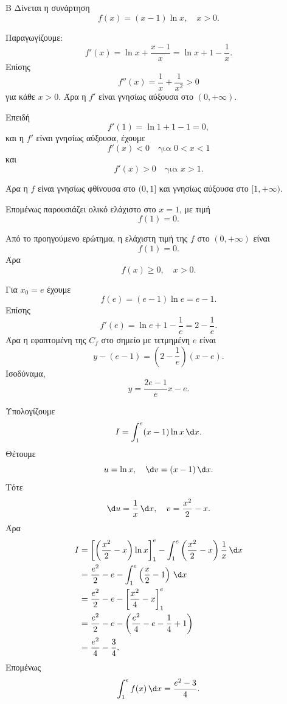 \begin{thema}{Β}
Δίνεται η συνάρτηση
\[
f(x)=(x-1)\ln x,\quad x>0.
\]
\begin{erwthma}
\item Παραγωγίζουμε:
\[
f'(x)=\ln x+\frac{x-1}{x}
=\ln x+1-\frac1x.
\]
Επίσης
\[
f''(x)=\frac1x+\frac{1}{x^2}>0
\]
για κάθε $x>0$. Άρα η $f'$ είναι γνησίως αύξουσα στο $(0,+\infty)$.

Επειδή
\[
f'(1)=\ln1+1-1=0,
\]
και η $f'$ είναι γνησίως αύξουσα, έχουμε
\[
f'(x)<0\quad\text{για }0<x<1
\]
και
\[
f'(x)>0\quad\text{για }x>1.
\]

Άρα η $f$ είναι γνησίως φθίνουσα στο $(0,1]$ και γνησίως αύξουσα στο $[1,+\infty)$.

Επομένως παρουσιάζει ολικό ελάχιστο στο $x=1$, με τιμή
\[
f(1)=0.
\]

\item Από το προηγούμενο ερώτημα, η ελάχιστη τιμή της $f$ στο $(0,+\infty)$ είναι
\[
f(1)=0.
\]
Άρα
\[
{f(x)\geq0,\quad x>0}.
\]

\item Για $x_0=e$ έχουμε
\[
f(e)=(e-1)\ln e=e-1.
\]
Επίσης
\[
f'(e)=\ln e+1-\frac1e
=2-\frac1e.
\]
Άρα η εφαπτομένη της $C_f$ στο σημείο με τετμημένη $e$ είναι
\[
y-(e-1)=\left(2-\frac1e\right)(x-e).
\]
Ισοδύναμα,
\[
{y=\frac{2e-1}{e}x-e}.
\]

\item Υπολογίζουμε
\[
I=\dint_1^e (x-1)\ln x\,\d x.
\]
Θέτουμε
\[
u=\ln x,\quad \d v=(x-1)\,\d x.
\]
Τότε
\[
\d u=\frac1x\,\d x,\quad v=\frac{x^2}{2}-x.
\]
Άρα
\begin{align*}
I
&=\left[\left(\frac{x^2}{2}-x\right)\ln x\right]_1^e
-\dint_1^e\left(\frac{x^2}{2}-x\right)\frac1x\,\d x\\
&=\frac{e^2}{2}-e-\dint_1^e\left(\frac{x}{2}-1\right)\,\d x\\
&=\frac{e^2}{2}-e-\left[\frac{x^2}{4}-x\right]_1^e\\
&=\frac{e^2}{2}-e-\left(\frac{e^2}{4}-e-\frac14+1\right)\\
&=\frac{e^2}{4}-\frac34.
\end{align*}
Επομένως
\[
{\dint_1^e f(x)\,\d x=\frac{e^2-3}{4}}.
\]
\end{erwthma}
\end{thema}

